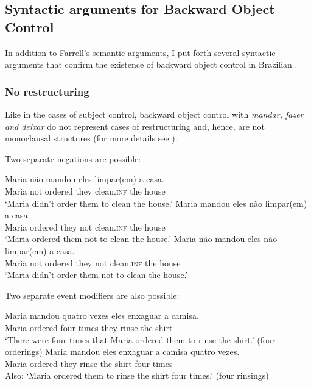 \documentclass[output=paper]{langsci/langscibook}
\begin{document}
\z

\subsection{Syntactic arguments for Backward Object Control} %

In addition to Farrell’s semantic arguments, I put forth several syntactic arguments that confirm the existence of backward object control in Brazilian .

\subsubsection{No restructuring}%

Like in the cases of subject control, backward object control with \textit{mandar, fazer and deixar} do not represent cases of restructuring and, hence, are not monoclausal structures (for more details see \citealt{Cyrino2010}):

Two separate negations are possible:\largerpage

\ea%
    \label{ex:moreno:14}
    \ea
    \gll Maria não   mandou   eles limpar(em)   a casa.\\
         Maria not   ordered   they clean.\textsc{inf}   the house\\
    \glt ‘Maria didn’t order them to clean the house.’
    \ex  
    \gll Maria mandou   eles não   limpar(em)   a casa.\\
         Maria ordered   they not   clean.\textsc{inf}   the house\\
    \glt ‘Maria ordered them not  to clean  the house.’
    \ex  
    \gll Maria não   mandou   eles não limpar(em)   a casa.\\
         Maria  not   ordered   they not clean.\textsc{inf}   the house\\
    \glt ‘Maria didn’t order them not to clean the house.’
    \z
\z

Two separate event modifiers are also possible:

\ea%
    \label{ex:moreno:15}
    \ea
    \gll Maria mandou   quatro vezes  eles enxaguar   a camisa.\\
         Maria ordered    four    times  they rinse   the shirt\\
    \glt ‘There were four times that Maria ordered them to rinse the shirt.’ (four orderings)
    \ex  
    \gll Maria mandou eles   enxaguar   a camisa   quatro vezes.\\
         Maria ordered they   rinse     the shirt  four times\\
    \glt Also: ‘Maria ordered them to rinse the shirt four times.’ (four rinsings)
    \z
\z
\end{document}
